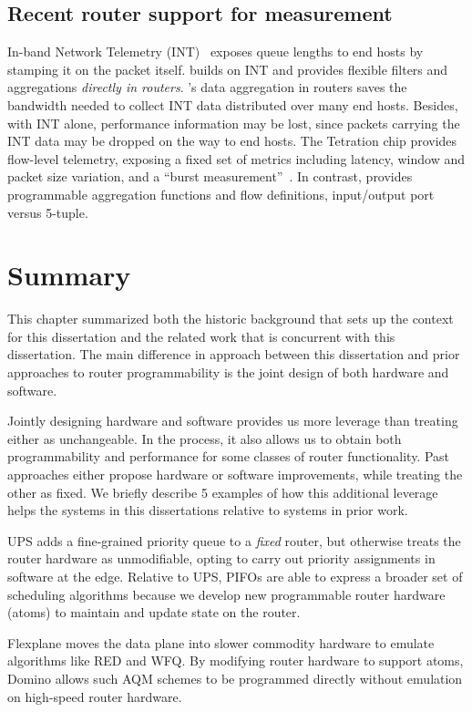 \subsection{Recent router support for measurement} In-band Network Telemetry
(INT)~\cite{int, int_paper} exposes queue lengths to end hosts by stamping it
on the packet itself. \TheSystem builds on INT and provides flexible filters
and aggregations {\em directly in routers}.  \TheSystem's data aggregation in
routers saves the bandwidth needed to collect INT data distributed over many
end hosts. Besides, with INT alone, performance information may be lost, since
packets carrying the INT data may be dropped on the way to end hosts. The
Tetration chip provides flow-level telemetry, exposing a fixed set of metrics
including latency, window and packet size variation, and a ``burst
measurement''~\cite{tetration-telemetry}. In contrast, \TheSystem provides
programmable aggregation functions and flow definitions, \eg input/output port
versus 5-tuple.

\section{Summary}
This chapter summarized both the historic background that sets up the context
for this dissertation and the related work that is concurrent with this
dissertation. The main difference in approach between this dissertation and
prior approaches to router programmability is the joint design of both
hardware and software.

Jointly designing hardware and software provides us more leverage than treating
either as unchangeable. In the process, it also allows us to obtain both
programmability and performance for some classes of router functionality.  Past
approaches either propose hardware or software improvements, while treating the
other as fixed. We briefly describe 5 examples of how this additional leverage
helps the systems in this dissertations relative to systems in prior work.

 UPS adds a fine-grained priority queue to a
{\em fixed} router, but otherwise treats the router hardware as unmodifiable,
opting to carry out priority assignments in software at the edge. Relative to
UPS, PIFOs are able to express a broader set of scheduling algorithms because
we develop new programmable router hardware (atoms) to maintain and update
state on the router.

 Flexplane moves the data plane into slower commodity hardware
to emulate algorithms like RED and WFQ. By modifying router hardware to support
atoms,  Domino allows such AQM schemes to be programmed directly without
emulation on high-speed router hardware.

